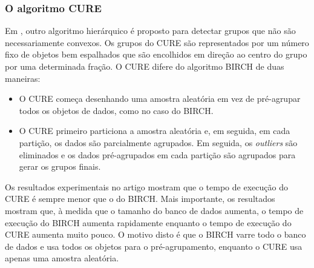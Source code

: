\begin{figure}[!ht]
	\centering
\end{figure}

\subsubsection{O algoritmo CURE}
Em \cite{Guha1998}, outro algoritmo hierárquico é proposto para detectar grupos que não são necessariamente convexos. Os grupos do CURE são representados por um número fixo de objetos bem espalhados que são encolhidos em direção ao centro do grupo por uma determinada fração. O CURE difere do algoritmo BIRCH de duas maneiras:
\begin{itemize}
\item O CURE começa desenhando uma amostra aleatória em vez de pré-agrupar todos os objetos de dados, como no caso do BIRCH.
\item O CURE primeiro particiona a amostra aleatória e, em seguida, em cada partição, os dados são parcialmente agrupados. Em seguida, os \textit{outliers} são eliminados e os dados pré-agrupados em cada partição são agrupados para gerar os grupos finais.
\end{itemize}
Os resultados experimentais no artigo mostram que o tempo de execução do CURE é sempre menor que o do BIRCH. Mais importante, os resultados mostram que, à medida que o tamanho do banco de dados aumenta, o tempo de execução do BIRCH aumenta rapidamente enquanto o tempo de execução do CURE aumenta muito pouco. O motivo disto é que o BIRCH varre todo o banco de dados e usa todos os objetos para o pré-agrupamento, enquanto o CURE usa apenas uma amostra aleatória.

